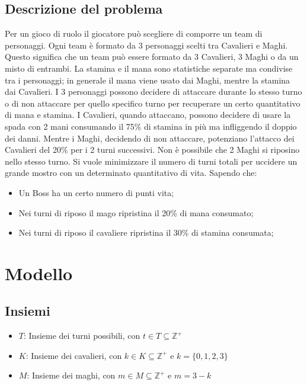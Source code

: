 \documentclass[12pt]{article}
\begin{document}
    \subsection{Descrizione del problema}
    Per un gioco di ruolo il giocatore può scegliere di comporre un team di personaggi.
    Ogni team è formato da 3 personaggi scelti tra Cavalieri e Maghi. Questo significa che un team può essere formato da 3 Cavalieri, 3 Maghi o da un misto di entrambi. 
    La stamina e il mana sono statistiche separate ma condivise tra i personaggi; in generale
    il mana viene usato dai Maghi, mentre la stamina dai Cavalieri.
    I 3 personaggi possono decidere di attaccare durante lo stesso turno o di non attaccare per quello specifico turno per recuperare un certo quantitativo di mana e stamina.
    I Cavalieri, quando attaccano, possono decidere di usare la spada con 2 mani consumando il 75\% di stamina in più ma infliggendo il doppio dei danni. Mentre i Maghi, decidendo di non attaccare, potenziano l'attacco dei Cavalieri del 20\% per i 2 turni successivi. Non è possibile che 2 Maghi si riposino nello stesso turno. Si vuole minimizzare il numero di turni totali per uccidere un grande mostro con un determinato quantitativo di vita. Sapendo che:
    \begin{itemize}
        \item Un Boss ha un certo numero di punti vita;
        \item Nei turni di riposo il mago ripristina il 20$\%$ di mana consumato;
        \item Nei turni di riposo il cavaliere ripristina il 30$\%$ di stamina consumata;
    \end{itemize}

    \section{Modello}
    \subsection{Insiemi}
    \begin{itemize}
        \item $T$: Insieme dei turni possibili, con $t \in T \subseteq \mathbb{Z}^+$
        \item $K$: Insieme dei cavalieri, con $k \in K \subseteq \mathbb{Z}^+$ e $k = \{ 0,1,2,3 \}$
        \item $M$: Insieme dei maghi, con $m \in M \subseteq \mathbb{Z}^+$ e $m = 3- k$
    \end{itemize}
\end{document}
